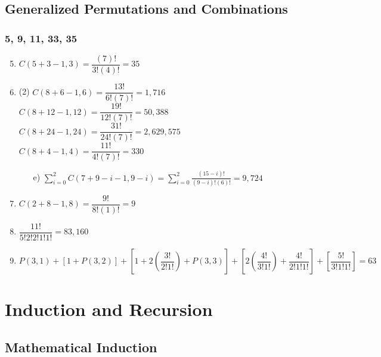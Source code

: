 \documentclass[12pt, A4]{article}
\begin{document}
			\subsection{Generalized Permutations and Combinations}
				\subsubsection*{5, 9, 11, 33, 35}
					\begin{enumerate}
						\setcounter{enumi}{4}
						\item
							\(C(5 + 3 - 1, 3) = \dfrac{(7)!}{3!(4)!} = 35\)
						\setcounter{enumi}{8}
						\item
							\begin{tasks}(2)
								\task
									\(C(8 + 6 - 1, 6) = \dfrac{13!}{6!(7)!} = 1,716\)	
								\task
									\(C(8 + 12 - 1, 12) = \dfrac{19!}{12!(7)!} = 50,388\)
								\task
									\(C(8 + 24 - 1, 24) = \dfrac{31!}{24!(7)!} = 2,629,575\)
								\task
									\(C(8 + 4 - 1, 4) = \dfrac{11!}{4!(7)!} = 330\)
							\end{tasks}
							\begin{itemize}[leftmargin = 1.04cm]
								\item[e)]
									\(\displaystyle \sum_{i = 0}^{2} C(7 + 9 - i - 1, 9 - i) = \sum_{i = 0}^2 \frac{(15 - i)!}{(9 - i)!(6)!} = 9,724\)	
							\end{itemize}
						\setcounter{enumi}{10}
						\item
							\(C(2 + 8 - 1, 8) = \dfrac{9!}{8!(1)!} = 9\)
						\setcounter{enumi}{32}
						\item
							\(\dfrac{11!}{5!2!2!1!1!} = 83,160\)
						\setcounter{enumi}{34}
						\item
							\(P(3, 1) + [1 + P(3, 2)] + \left[1 + 2\left(\dfrac{3!}{2!1!}\right) + P(3, 3)\right] + \left[2\left(\dfrac{4!}{3!1!}\right) + \dfrac{4!}{2!1!1!}\right] + \left[\dfrac{5!}{3!1!1!}\right] = 63\)
					\end{enumerate}
	\setcounter{section}{4}
	\section{Induction and Recursion}
		\subsection{Mathematical Induction}
\end{document}
